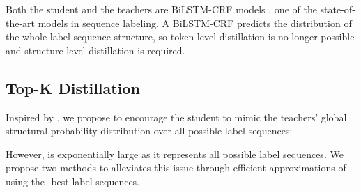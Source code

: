 \documentclass[11pt,a4paper]{article}
\begin{document}
Both the student and the teachers are BiLSTM-CRF models \cite{lample-etal-2016-neural,ma-hovy-2016-end}, one of the state-of-the-art models in sequence labeling. A BiLSTM-CRF predicts the distribution of the whole label sequence structure, so token-level distillation is no longer possible and structure-level distillation is required.

\subsection{Top-K Distillation}
\label{sec:Top-K}
Inspired by \citet{kim-rush-2016-sequence}, we propose to encourage the student to mimic the teachers' global structural probability distribution over all possible label sequences:

However,  is exponentially large as it represents all possible label sequences. We propose two methods to alleviates this issue through efficient approximations of  using the -best label sequences.
\end{document}
